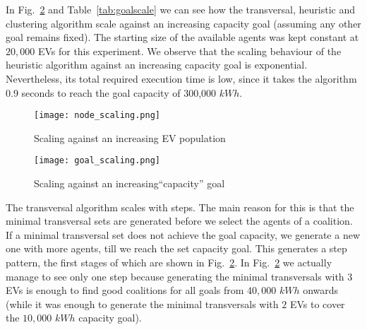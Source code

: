 In Fig.~\ref{fig:goalscale} and Table~\ref{tab:goalscale} 
we can see how the transversal, heuristic and clustering algorithm scale against an increasing capacity goal (assuming any other goal remains fixed). The starting size of the available agents was kept constant at $20,000$ EVs for this experiment. We observe that the scaling behaviour of the heuristic algorithm against an increasing capacity goal is exponential. %
Nevertheless, its total required execution time is low, since it takes the algorithm 0.9 seconds to reach the goal capacity of 300,000 $kWh$.
\begin{figure}
	\centering
		\texttt{[image: node\_scaling.png]}
		\caption{Scaling against an increasing
			\newline EV population\label{fig:popscale}}
\end{figure}
\begin{figure}
		\centering
		\texttt{[image: goal\_scaling.png]}
		\caption{Scaling against an increasing\newline ``capacity'' goal\label{fig:goalscale}}
\end{figure}
The transversal algorithm scales with steps. The main reason for this is that the minimal transversal sets are generated before we select the agents of a coalition. If a minimal transversal set does not achieve the goal capacity, we generate a new one with more agents, till we reach the set capacity goal. This generates a step pattern, the first stages of which are shown in Fig.~\ref{fig:goalscale}. In Fig.~\ref{fig:goalscale} we actually manage to see only one step because generating the minimal transversals with $3$ EVs is enough to find good coalitions for all goals from $40,000$ $kWh$ onwards (while it was enough to generate the minimal transversals with $2$ EVs to cover the $10,000$ $kWh$ capacity goal). %

